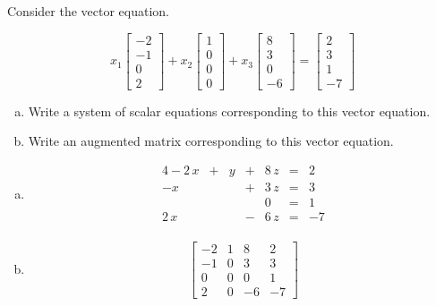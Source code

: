 
\begin{exerciseStatement}


Consider the vector equation.

\[ x_{1} \left[\begin{array}{c}
-2 \\
-1 \\
0 \\
2
\end{array}\right] + x_{2} \left[\begin{array}{c}
1 \\
0 \\
0 \\
0
\end{array}\right] + x_{3} \left[\begin{array}{c}
8 \\
3 \\
0 \\
-6
\end{array}\right] = \left[\begin{array}{c}
2 \\
3 \\
1 \\
-7
\end{array}\right] \]
\begin{enumerate}[(a)]
\item  Write a system of scalar equations corresponding to this vector equation. 
\item  Write an augmented matrix corresponding to this vector equation. 
\end{enumerate}
    
\end{exerciseStatement}
    
\begin{exerciseAnswer} 

\begin{enumerate}[(a)]
\item 
\begin{alignat*}{4} -2 \, x &+& y &+& 8 \, z &=& 2 \\-x & &  &+& 3 \, z &=& 3 \\ & &  & & 0 &=& 1 \\2 \, x & &  &-& 6 \, z &=& -7 \\ \end{alignat*}
            
\item \[ \left[\begin{array}{ccc|c}
-2 & 1 & 8 & 2 \\
-1 & 0 & 3 & 3 \\
0 & 0 & 0 & 1 \\
2 & 0 & -6 & -7
\end{array}\right] \]
\end{enumerate}
    
\end{exerciseAnswer}
    
